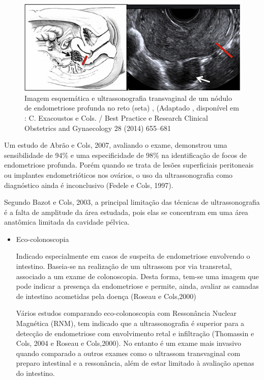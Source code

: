 \documentclass[12pt]{article} %
\begin{document}
\begin{figure}[h!]
\centering
\includegraphics[width=14cm]{USV.png}
\caption[Imagem esquemática e ultrassonografia transvaginal de um nódulo de endometriose profunda no reto]{Imagem esquemática e ultrassonografia transvaginal de um nódulo de endometriose profunda no reto (seta) , (Adaptado , disponível em : C. Exacoustos e Cols. / Best Practice e Research Clinical Obstetrics and Gynaecology 28 (2014) 655–681 }
\end{figure}

Um estudo de Abrão e Cols, 2007, avaliando o exame, demonstrou uma sensibilidade de 94\% e uma especificidade de 98\% na identificação de focos de endometriose profunda. Porém quando se trata de lesões superficiais peritoneais ou implantes endometrióticos nos ovários, o uso da ultrassonografia como diagnóstico ainda é inconclusivo (Fedele e Cols, 1997).

Segundo Bazot e Cols, 2003, a principal limitação das técnicas de ultrassonografia é a falta de amplitude da área estudada, pois elas se concentram em uma área anatômica limitada da cavidade pélvica.

\begin{itemize}
\item Eco-colonoscopia

Indicado especialmente em casos de suspeita de endometriose envolvendo o intestino. Baseia-se na realização de um ultrassom por via transretal, associado a um exame de colonoscopia. Desta forma, tem-se uma imagem que pode indicar a presença da endometriose e permite, ainda, avaliar as camadas de intestino acometidas pela doença (Roseau e Cols,2000)

Vários estudos comparando eco-colonoscopia com Ressonância Nuclear Magnética (RNM), tem
indicado que a ultrassonografia é superior para a detecção de endometriose com envolvimento retal e
infiltração (Thomassin e Cols, 2004 e Roseau e Cols,2000). No entanto é um exame mais invasivo quando comparado a outros exames como o ultrassom transvaginal com preparo intestinal e a ressonância, além de estar limitado à avaliação apenas do intestino.
\end{itemize}
\end{document}
